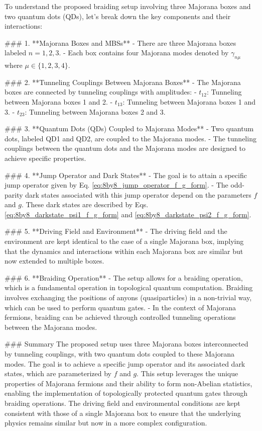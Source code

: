 To understand the proposed braiding setup involving three Majorana boxes and two quantum dots (QDs), let's break down the key components and their interactions:

### 1. **Majorana Boxes and MBSs**
- There are three Majorana boxes labeled \( n = 1, 2, 3 \).
- Each box contains four Majorana modes denoted by \( \gamma_{n \mu} \) where \( \mu \in \{1, 2, 3, 4\} \).

### 2. **Tunneling Couplings Between Majorana Boxes**
- The Majorana boxes are connected by tunneling couplings with amplitudes:
  - \( t_{12} \): Tunneling between Majorana boxes 1 and 2.
  - \( t_{13} \): Tunneling between Majorana boxes 1 and 3.
  - \( t_{23} \): Tunneling between Majorana boxes 2 and 3.

### 3. **Quantum Dots (QDs) Coupled to Majorana Modes**
- Two quantum dots, labeled QD1 and QD2, are coupled to the Majorana modes.
- The tunneling couplings between the quantum dots and the Majorana modes are designed to achieve specific properties.

### 4. **Jump Operator and Dark States**
- The goal is to attain a specific jump operator given by Eq. \eqref{eq:8by8_jump_operator_f_g_form}.
- The odd-parity dark states associated with this jump operator depend on the parameters \( f \) and \( g \). These dark states are described by Eqs. \eqref{eq:8by8_darkstate_psi1_f_g_form} and \eqref{eq:8by8_darkstate_psi2_f_g_form}.

### 5. **Driving Field and Environment**
- The driving field and the environment are kept identical to the case of a single Majorana box, implying that the dynamics and interactions within each Majorana box are similar but now extended to multiple boxes.

### 6. **Braiding Operation**
- The setup allows for a braiding operation, which is a fundamental operation in topological quantum computation. Braiding involves exchanging the positions of anyons (quasiparticles) in a non-trivial way, which can be used to perform quantum gates.
- In the context of Majorana fermions, braiding can be achieved through controlled tunneling operations between the Majorana modes.

### Summary
The proposed setup uses three Majorana boxes interconnected by tunneling couplings, with two quantum dots coupled to these Majorana modes. The goal is to achieve a specific jump operator and its associated dark states, which are parameterized by \( f \) and \( g \). This setup leverages the unique properties of Majorana fermions and their ability to form non-Abelian statistics, enabling the implementation of topologically protected quantum gates through braiding operations. The driving field and environmental conditions are kept consistent with those of a single Majorana box to ensure that the underlying physics remains similar but now in a more complex configuration.